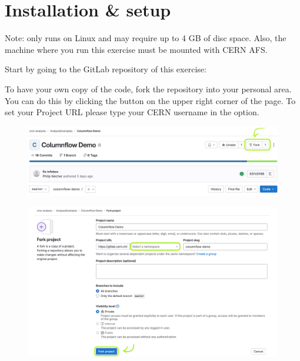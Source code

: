 \section{Installation \& setup}
\justifying
\begin{tcolorbox}[colback=green!5!white,colframe=green!75!black,width=\textwidth]
Note: \columnflow only runs on Linux and may require up to 4 GB of disc space. \tcblower
Also, the machine where you run this exercise must be mounted with CERN AFS.
\end{tcolorbox}

Start by going to the GitLab repository of this exercise:


To have your own copy of the code, fork the repository into your personal area. You can do this by clicking the  button on the upper right corner of the page. To set your Project URL please type your CERN username in the  option.

\begin{figure}[!h]
    \centering
    \includegraphics[scale=0.62]{images/gitlab.png}
\end{figure}
\begin{figure}[!h]
    \centering
    \includegraphics[scale=0.62]{images/fork1.png}
\end{figure}

